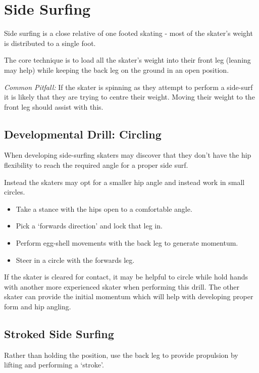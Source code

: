 \section{Side Surfing}
\label{sec:one_foot/side_surf}

Side surfing is a close relative of one footed skating - most of the skater's weight is distributed to a single foot.

The core technique is to load all the skater's weight into their front leg (leaning may help) while keeping the back leg on the ground in an open position.

{\it Common Pitfall:} If the skater is spinning as they attempt to perform a side-surf it is likely that they are trying to centre their weight.  
Moving their weight to the front leg should assist with this.

\subsection*{Developmental Drill: Circling}

When developing side-surfing skaters may discover that they don't have the hip flexibility to reach the required angle for a proper side surf.   

Instead the skaters may opt for a smaller hip angle and instead work in small circles. 

\begin{itemize}
\item Take a stance with the hips open to a comfortable angle.
\item Pick a `forwards direction' and lock that leg in. 
\item Perform egg-shell movements with the back leg to generate momentum. 
\item Steer in a circle with the forwards leg.
\end{itemize}


If the skater is cleared for contact, it may be helpful to circle while hold hands with another more experienced skater when performing this drill.  
The other skater can provide the initial momentum which will help with developing proper form and hip angling.  

\subsection*{Stroked Side Surfing}

Rather than holding the position, use the back leg to provide propulsion by lifting and performing a `stroke'.    

